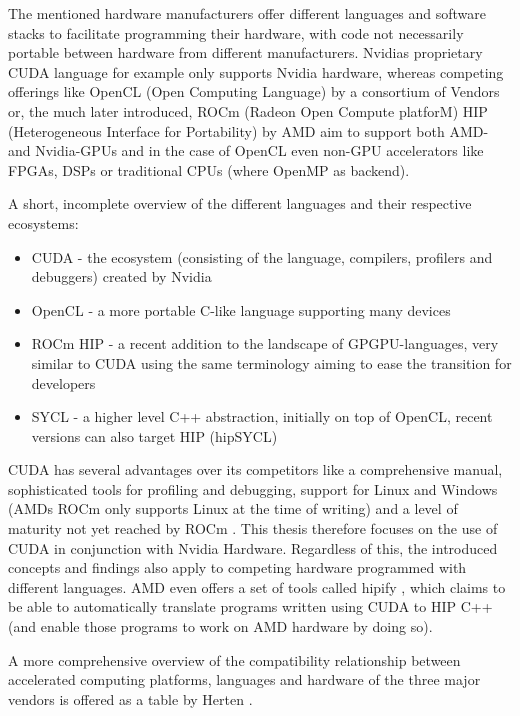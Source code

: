 \documentclass[english,11pt,a4paper,table]{article} %
\begin{document}
The mentioned hardware manufacturers offer different languages and software stacks to facilitate programming their hardware, with code not necessarily portable between hardware from different manufacturers.
Nvidias proprietary CUDA language for example only supports Nvidia hardware, whereas competing offerings like OpenCL (Open Computing Language) by a consortium of Vendors or, the much later introduced, ROCm (Radeon Open Compute platforM) HIP (Heterogeneous Interface for Portability) by AMD aim to support both AMD- and Nvidia-GPUs and in the case of OpenCL even non-GPU accelerators like FPGAs, DSPs or traditional CPUs (where OpenMP as backend).

A short, incomplete overview of the different languages and their respective ecosystems:

\begin{itemize}
	\item CUDA - the ecosystem (consisting of the language, compilers, profilers and debuggers) created by Nvidia
	\item OpenCL - a more portable C-like language supporting many devices
	\item ROCm HIP - a recent addition to the landscape of GPGPU-languages, very similar to CUDA using the same terminology aiming to ease the transition for developers
	\item SYCL - a higher level C++ abstraction, initially on top of OpenCL, recent versions can also target HIP (hipSYCL)
\end{itemize}

CUDA has several advantages over its competitors like a comprehensive manual, sophisticated tools for profiling and debugging, support for Linux and Windows (AMDs ROCm only supports Linux at the time of writing) and a level of maturity not yet reached by ROCm \cite{otterness_et_al:LIPIcs:2020:12373}.
This thesis therefore focuses on the use of CUDA in conjunction with Nvidia Hardware.
Regardless of this, the introduced concepts and findings also apply to competing hardware programmed with different languages.
AMD even offers a set of tools called hipify \cite{hipify:online}, which claims to be able to automatically translate programs written using CUDA to HIP C++ (and enable those programs to work on AMD hardware by doing so).

A more comprehensive overview of the compatibility relationship between accelerated computing platforms, languages and hardware of the three major vendors is offered as a table by Herten \cite{Herten2022-zs}. 
\end{document}
